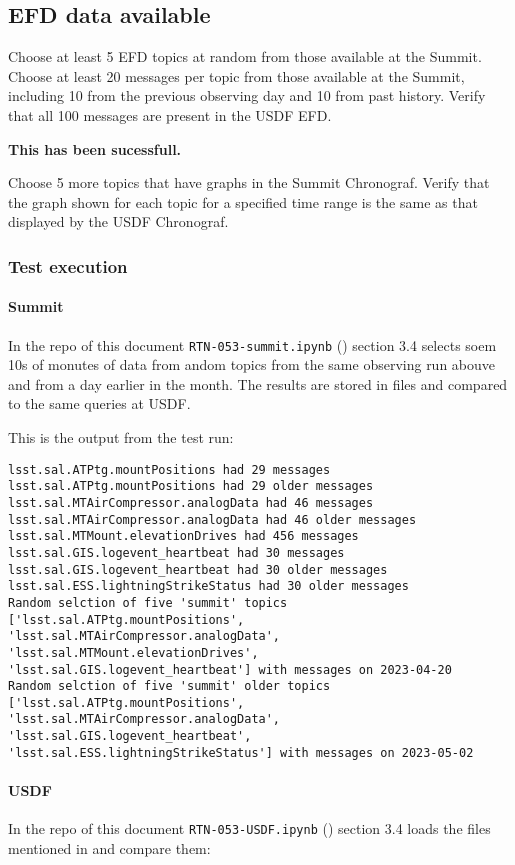 \subsection{EFD data available }
Choose at least 5 EFD topics at random from those available at the Summit.
Choose at least 20 messages per topic from those available at the Summit, including 10 from the previous observing day and 10 from past history.
Verify that all 100 messages are present in the USDF EFD.

\textbf{This has been sucessfull.}

Choose 5 more topics that have graphs in the Summit Chronograf.
Verify that the graph shown for each topic for a specified time range is the same as that displayed by the USDF Chronograf.
\subsubsection{Test execution}
\paragraph{Summit} \label{sec:efdsummit}
In the repo of this document \texttt{RTN-053-summit.ipynb} ()  section 3.4
selects soem 10s of monutes of data from andom topics from the same observing run abouve and from a day earlier in the month.
The results are stored in files and compared to the same  queries at USDF.

This is the output from the test run:

\begin{lstlisting}
lsst.sal.ATPtg.mountPositions had 29 messages
lsst.sal.ATPtg.mountPositions had 29 older messages
lsst.sal.MTAirCompressor.analogData had 46 messages
lsst.sal.MTAirCompressor.analogData had 46 older messages
lsst.sal.MTMount.elevationDrives had 456 messages
lsst.sal.GIS.logevent_heartbeat had 30 messages
lsst.sal.GIS.logevent_heartbeat had 30 older messages
lsst.sal.ESS.lightningStrikeStatus had 30 older messages
Random selction of five 'summit' topics ['lsst.sal.ATPtg.mountPositions',
'lsst.sal.MTAirCompressor.analogData', 'lsst.sal.MTMount.elevationDrives',
'lsst.sal.GIS.logevent_heartbeat'] with messages on 2023-04-20
Random selction of five 'summit' older topics ['lsst.sal.ATPtg.mountPositions',
'lsst.sal.MTAirCompressor.analogData', 'lsst.sal.GIS.logevent_heartbeat',
'lsst.sal.ESS.lightningStrikeStatus'] with messages on 2023-05-02
\end{lstlisting}

\paragraph{USDF}
In the repo of this document \texttt{RTN-053-USDF.ipynb} ()  section 3.4
loads the files mentioned in  and compare them:

